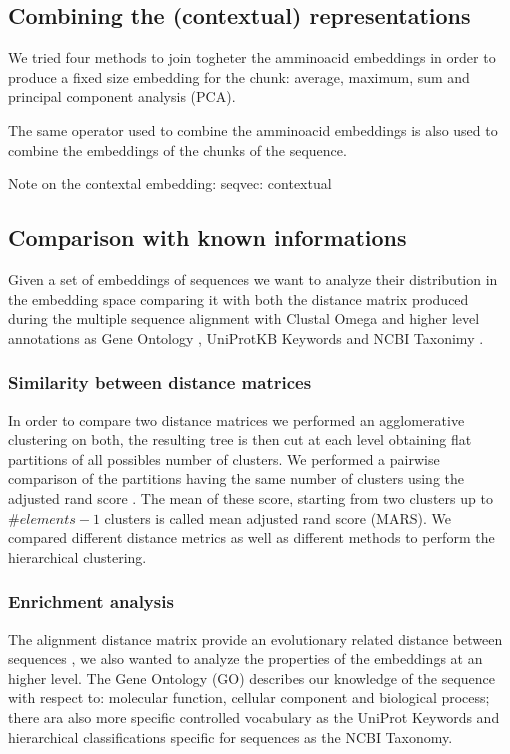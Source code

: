 \documentclass[12pt, letterpaper, twocolumn]{article}
\begin{document}
\subsection{Combining the (contextual) representations}
We tried four methods to join togheter the amminoacid embeddings in order to produce a fixed size embedding for the chunk: average, maximum, sum and principal component analysis (PCA). 

The same operator used to combine the amminoacid embeddings is also used to combine the embeddings of the chunks of the sequence.

Note on the contextal embedding: seqvec: contextual

\subsection{Comparison with known informations}
Given a set of embeddings of sequences we want to analyze their distribution in the embedding space comparing it with both the distance matrix produced during the multiple sequence alignment with Clustal Omega \cite{sievers2011fast} and higher level annotations as Gene Ontology \cite{10.1093/genetics/iyad031, ashburner2000gene}, UniProtKB Keywords and NCBI Taxonimy \cite{uniprot23}.

\subsubsection{Similarity between distance matrices \label{sec:similarity}}
In order to compare two distance matrices we performed an agglomerative clustering on both, the resulting tree is then cut at each level obtaining flat partitions of all possibles number of clusters. We performed a pairwise comparison of the partitions having the same number of clusters using the adjusted rand score \cite{hubert1985comparing}. The mean of these score, starting from two clusters up to $ \#elements - 1 $ clusters is called mean adjusted rand score (MARS). We compared different distance metrics as well as different methods to perform the hierarchical clustering.  

\subsubsection{Enrichment analysis}
The alignment distance matrix provide an evolutionary related distance between sequences \cite{SOFI202247}, we also wanted to analyze the properties of the embeddings at an higher level. The Gene Ontology (GO) describes our knowledge of the sequence with respect to: molecular function, cellular component and biological process; there ara also more specific controlled vocabulary as the UniProt Keywords and hierarchical classifications specific for sequences as the NCBI Taxonomy.
\end{document}

